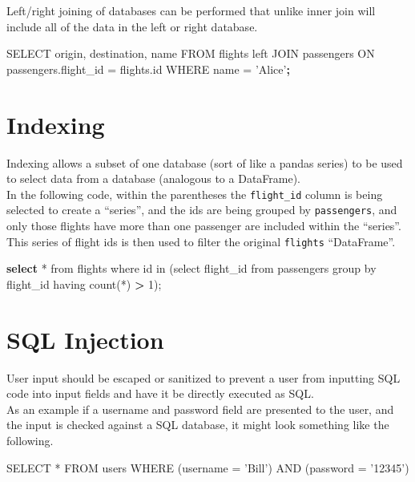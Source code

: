 \documentclass[]{book}
\newenvironment{Shaded}{\begin{snugshade}}{\end{snugshade}}
\newcommand{\ExtensionTok}[1]{#1}
\newcommand{\KeywordTok}[1]{\textcolor[rgb]{0.13,0.29,0.53}{\textbf{#1}}}
\newcommand{\NormalTok}[1]{#1}
\newcommand{\OperatorTok}[1]{\textcolor[rgb]{0.81,0.36,0.00}{\textbf{#1}}}
\newcommand{\StringTok}[1]{\textcolor[rgb]{0.31,0.60,0.02}{#1}}
\begin{document}
Left/right joining of databases can be performed that unlike inner join will include all of the data in the left or right database.

\begin{Shaded}
\begin{Highlighting}[]
\ExtensionTok{SELECT}\NormalTok{ origin, destination, name FROM flights left JOIN passengers ON passengers.flight_id = flights.id WHERE name = }\StringTok{'Alice'}\KeywordTok{;}
\end{Highlighting}
\end{Shaded}

\hypertarget{indexing}{%
\section{Indexing}\label{indexing}}

Indexing allows a subset of one database (sort of like a pandas series) to be used to select data from a database (analogous to a DataFrame).\\
In the following code, within the parentheses the \texttt{flight\_id} column is being selected to create a ``series'', and the ids are being grouped by \texttt{passengers}, and only those flights have more than one passenger are included within the ``series''. This series of flight ids is then used to filter the original \texttt{flights} ``DataFrame''.

\begin{Shaded}
\begin{Highlighting}[]
\KeywordTok{select} \ExtensionTok{*}\NormalTok{ from flights where id in (select flight_id from passengers group by flight_id having count(*) }\OperatorTok{>} \ExtensionTok{1}\NormalTok{);}
\end{Highlighting}
\end{Shaded}

\hypertarget{sql-injection}{%
\section{SQL Injection}\label{sql-injection}}

User input should be escaped or sanitized to prevent a user from inputting SQL code into input fields and have it be directly executed as SQL.\\
As an example if a username and password field are presented to the user, and the input is checked against a SQL database, it might look something like the following.

\begin{Shaded}
\begin{Highlighting}[]
\ExtensionTok{SELECT}\NormalTok{ * FROM users WHERE (username = }\StringTok{'Bill'}\NormalTok{) }\ExtensionTok{AND}\NormalTok{ (password = }\StringTok{'12345'}\NormalTok{)}
\end{Highlighting}
\end{Shaded}
\end{document}
